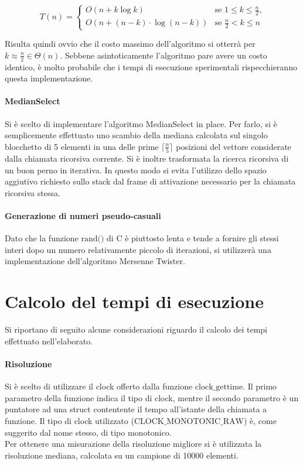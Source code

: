 \documentclass{article}
\begin{document}
	\[
		T\left(n\right) =
			\begin{cases}
				O\left(n + k\log{k}\right)  & \text{se $1\leq k \leq \frac{n}{2}$,} \\
				O\left(n + \left(n-k\right)\cdot\log{\left(n-k\right)}\right) & \text{se $\frac{n}{2} < k \leq n$} 
			\end{cases}
			\tag{1}
			\label{eq:heap}
	\]
	
	Risulta quindi ovvio che il costo massimo dell'algoritmo si otterrà per $k\approx \frac{n}{2} \in \Theta\left(n\right)$. Sebbene asintoticamente l'algoritmo pare avere un costo identico, è molto probabile che i tempi di esecuzione sperimentali rispecchieranno questa implementazione.
	
	\paragraph{MedianSelect} 
	Si è scelto di implementare l'algoritmo MedianSelect in place. Per farlo, si è semplicemente effettuato uno scambio della mediana calcolata sul singolo blocchetto di 5 elementi in una delle prime $\lceil\frac{n}{5}\rceil$ posizioni del vettore considerate dalla chiamata ricorsiva corrente. Si è inoltre trasformata la ricerca ricorsiva di un buon perno in iterativa. In questo modo si evita l'utilizzo dello spazio aggiutivo richiesto sullo stack dal frame di attivazione necessario per la chiamata ricorsiva stessa.
	
	\paragraph{Generazione di numeri pseudo-casuali}
	Dato che la funzione $\text{rand()}$ di C è piuttosto lenta e tende a fornire gli stessi interi dopo un numero relativamente piccolo di iterazioni, si utilizzerà una implementazione dell'algoritmo Mersenne Twister.
	
	\newpage
	\section{Calcolo del tempi di esecuzione}	
	Si riportano di seguito alcune	considerazioni riguardo il calcolo dei tempi effettuato nell'elaborato.
	
	\paragraph{Risoluzione}
	Si è scelto di utilizzare il clock offerto dalla funzione $\text{clock\_gettime}$. Il primo parametro della funzione indica il tipo di clock, mentre il secondo parametro è un puntatore ad una struct contentente il tempo all'istante della chiamata a funzione. Il tipo di clock utilizzato ($\text{CLOCK\_MONOTONIC\_RAW}$) è, come suggerito dal nome stesso, di tipo monotonico. \\ Per ottenere una misurazione della risoluzione migliore si è utilizzata la risoluzione mediana, calcolata su un campione di 10000 elementi.
	
\end{document}
